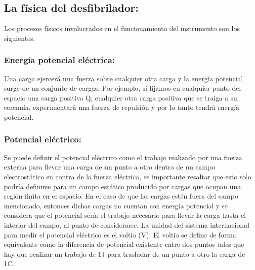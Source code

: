 \subsection{La física del desfibrilador:}

Los procesos físicos involucrados en el funcionamiento del instrumento son los siguientes.

\subsubsection{Energía potencial eléctrica:}
Una carga ejercerá una fuerza sobre cualquier otra carga y la energía potencial surge de un conjunto de cargas. Por ejemplo, si fijamos en cualquier punto del espacio una carga positiva Q, cualquier otra carga positiva que se traiga a su cercanía, experimentará una fuerza de repulsión y por lo tanto tendrá energía potencial.

\subsubsection{Potencial eléctrico:}

Se puede definir el potencial eléctrico como el trabajo realizado por una fuerza externa para llevar una carga de un punto a otro dentro de un campo electrostático en contra de la fuerza eléctrica, es importante resaltar que esto solo podría definirse para un campo estático producido por cargas que ocupan una región finita en el espacio. En el caso de que las cargas estén fuera del campo mencionado, entonces dichas cargas no cuentan con energía potencial y se considera que el potencial sería el trabajo necesario para llevar la carga hasta el interior del campo, al punto de considerarse. La unidad del sistema internacional para medir el potencial eléctrico es el voltio (V). \newline \hfill \break
El voltio se define de forma equivalente como la diferencia de potencial existente entre dos puntos tales que hay que realizar un trabajo de 1J para trasladar de un punto a otro la carga de 1C.


